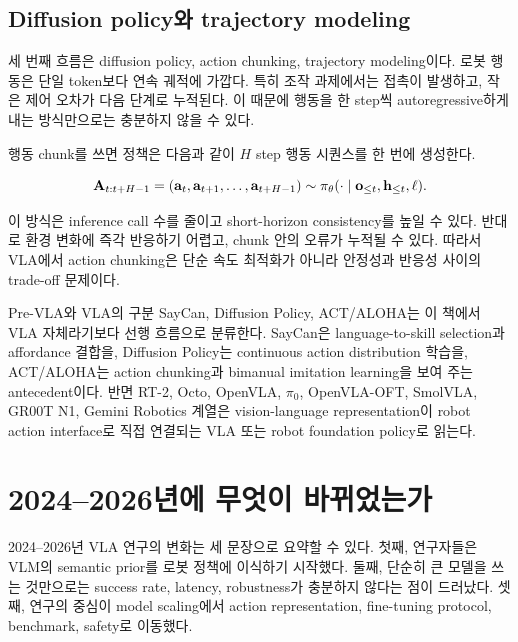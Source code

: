 \subsection{Diffusion policy와 trajectory modeling}

세 번째 흐름은 diffusion policy, action chunking, trajectory modeling이다. 로봇 행동은 단일 token보다 연속 궤적에 가깝다. 특히 조작 과제에서는 접촉이 발생하고, 작은 제어 오차가 다음 단계로 누적된다. 이 때문에 행동을 한 step씩 autoregressive하게 내는 방식만으로는 충분하지 않을 수 있다.

행동 chunk를 쓰면 정책은 다음과 같이 $H$ step 행동 시퀀스를 한 번에 생성한다.

\begin{equation}
  \mathbf{A}_{t:t+H-1}
  =
  (\mathbf{a}_t, \mathbf{a}_{t+1}, \ldots, \mathbf{a}_{t+H-1})
  \sim
  \pi_\theta(\cdot \mid \mathbf{o}_{\le t}, \mathbf{h}_{\le t}, \ell).
  \label{eq:action_chunk}
\end{equation}

이 방식은 inference call 수를 줄이고 short-horizon consistency를 높일 수 있다. 반대로 환경 변화에 즉각 반응하기 어렵고, chunk 안의 오류가 누적될 수 있다. 따라서 VLA에서 action chunking은 단순 속도 최적화가 아니라 안정성과 반응성 사이의 trade-off 문제이다.

\begin{sourcebox}{Pre-VLA와 VLA의 구분}
SayCan, Diffusion Policy, ACT/ALOHA는 이 책에서 VLA 자체라기보다 선행 흐름으로 분류한다. SayCan은 language-to-skill selection과 affordance 결합을, Diffusion Policy는 continuous action distribution 학습을, ACT/ALOHA는 action chunking과 bimanual imitation learning을 보여 주는 antecedent이다. 반면 RT-2, Octo, OpenVLA, \(\pi_0\), OpenVLA-OFT, SmolVLA, GR00T N1, Gemini Robotics 계열은 vision-language representation이 robot action interface로 직접 연결되는 VLA 또는 robot foundation policy로 읽는다.
\end{sourcebox}

\section{2024--2026년에 무엇이 바뀌었는가}

2024--2026년 VLA 연구의 변화는 세 문장으로 요약할 수 있다. 첫째, 연구자들은 VLM의 semantic prior를 로봇 정책에 이식하기 시작했다. 둘째, 단순히 큰 모델을 쓰는 것만으로는 success rate, latency, robustness가 충분하지 않다는 점이 드러났다. 셋째, 연구의 중심이 model scaling에서 action representation, fine-tuning protocol, benchmark, safety로 이동했다.

